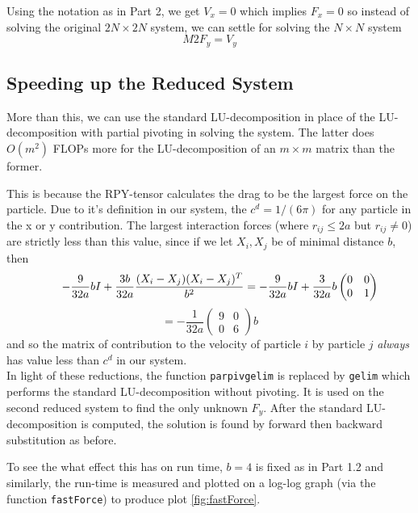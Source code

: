 \documentclass[paper=a4, fontsize=12pt]{scrartcl} %
\numberwithin{equation}{section}       %
\numberwithin{figure}{section}         %
\numberwithin{table}{section}          %
\begin{document}
\noindent Using the notation as in Part 2, we get $V_x = 0$ which implies $F_x = 0$ so instead of solving the original $2N\times 2N$ system, we can settle for solving the $N\times N$ system 
$$
M2F_y = V_y
$$

\subsection{Speeding up the Reduced System}
More than this, we can use the standard LU-decomposition in place of the LU-decomposition with partial pivoting in solving the system. The latter does $O(m^2)$ FLOPs more for the LU-decomposition of an $m\times m$ matrix than the former. 

\indent  This is because the RPY-tensor calculates the drag to be the largest force on the particle. Due to it's definition in our system, the $c^d = 1/(6\pi)$ for any particle in the x or y contribution. The largest interaction forces (where $r_{ij} \leq 2a$ but $r_{ij} \neq 0 $) are strictly less than this value, since if we let $X_i,X_j$ be of minimal distance $b$, then 
$$
\qquad - \frac{9}{32a}bI + \frac{3b}{32a}\frac{(X_i - X_j)(X_i - X_j)^T}{b^2} \\
= -\frac{9}{32a}bI + \frac{3}{32a}b      \begin{pmatrix}
											0 & 0 \\ 
											0 & 1 
										\end{pmatrix} \\
$$
$$
= -\frac{1}{32a}\begin{pmatrix} 
				9 & 0 \\ 
				0 & 6		
			  \end{pmatrix} b
$$
and so the matrix of contribution to the velocity of particle $i$ by particle $j$ \textit{always} has value less than $c^d$ in our system. \\

\noindent In light of these reductions, the function \texttt{parpivgelim} is replaced by \texttt{gelim} which performs the standard LU-decomposition without pivoting. It is used on the second reduced system to find the only unknown $F_y$. After the standard LU-decomposition is computed, the solution is found by forward then backward substitution as before. 

\indent To see the what effect this has on run time, $b=4$ is fixed as in Part 1.2 and similarly, the run-time is measured and plotted on a log-log graph (via the function \texttt{fastForce}) to produce plot \ref{fig:fastForce}.
\end{document}
